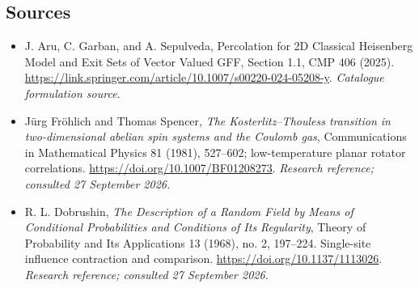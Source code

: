 \documentclass[11pt,a4paper]{article}
\numberwithin{equation}{section}
\begin{document}
\subsection{Sources}
\begin{itemize}\raggedright
\item[\textnormal{[S1]}]\hypertarget{source:187:1}{} J. Aru, C. Garban, and A. Sepulveda, Percolation for 2D Classical Heisenberg Model and Exit Sets of Vector Valued GFF, Section 1.1, CMP 406 (2025).
\url{https://link.springer.com/article/10.1007/s00220-024-05208-y}.
{\small\textit{Catalogue formulation source.}}
\item[\textnormal{[E1]}]\hypertarget{extra:187:1}{} J\"urg Fr\"ohlich and Thomas Spencer, \emph{The Kosterlitz--Thouless transition in two-dimensional abelian spin systems and the Coulomb gas}, Communications in Mathematical Physics 81 (1981), 527--602; low-temperature planar rotator correlations.
\url{https://doi.org/10.1007/BF01208273}.
{\small\textit{Research reference; consulted 27 September 2026.}}
\item[\textnormal{[E2]}]\hypertarget{extra:187:2}{} R. L. Dobrushin, \emph{The Description of a Random Field by Means of Conditional Probabilities and Conditions of Its Regularity}, Theory of Probability and Its Applications 13 (1968), no. 2, 197--224. Single-site influence contraction and comparison.
\url{https://doi.org/10.1137/1113026}.
{\small\textit{Research reference; consulted 27 September 2026.}}
\end{itemize}
\end{document}
